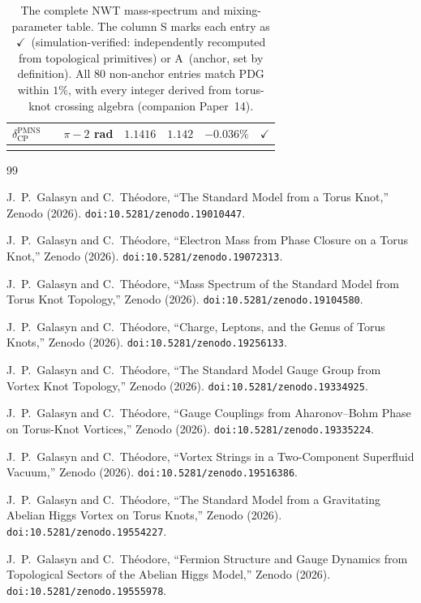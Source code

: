 \documentclass[11pt]{article}
\begin{document}
{\begin{longtable}{@{}p{1.2cm}p{2.4cm}p{4.8cm}p{1.6cm}p{1.4cm}rc@{}}
$\delta_\text{CP}^\text{PMNS}$ &  & $\pi{-}2$ rad & $1.1416$ & $1.142$ & $-0.036\%$ & $\checkmark$ \\
\bottomrule
\caption{The complete NWT mass-spectrum and mixing-parameter
table.  The column S marks each entry as
$\checkmark$~(simulation-verified: independently recomputed from
topological primitives) or
A~(anchor, set by definition).
All 80 non-anchor entries match PDG within $1\%$, with every
integer derived from torus-knot crossing algebra
(companion Paper~14).}
\label{tab:full-spectrum}
\end{longtable}
}

\begin{thebibliography}{99}

J.~P.~Galasyn and C.~Th\'eodore,
``The Standard Model from a Torus Knot,''
Zenodo (2026). \texttt{doi:10.5281/zenodo.19010447}.

J.~P.~Galasyn and C.~Th\'eodore,
``Electron Mass from Phase Closure on a Torus Knot,''
Zenodo (2026). \texttt{doi:10.5281/zenodo.19072313}.

J.~P.~Galasyn and C.~Th\'eodore,
``Mass Spectrum of the Standard Model from Torus Knot Topology,''
Zenodo (2026). \texttt{doi:10.5281/zenodo.19104580}.

J.~P.~Galasyn and C.~Th\'eodore,
``Charge, Leptons, and the Genus of Torus Knots,''
Zenodo (2026). \texttt{doi:10.5281/zenodo.19256133}.

J.~P.~Galasyn and C.~Th\'eodore,
``The Standard Model Gauge Group from Vortex Knot Topology,''
Zenodo (2026). \texttt{doi:10.5281/zenodo.19334925}.

J.~P.~Galasyn and C.~Th\'eodore,
``Gauge Couplings from Aharonov--Bohm Phase on Torus-Knot Vortices,''
Zenodo (2026). \texttt{doi:10.5281/zenodo.19335224}.

J.~P.~Galasyn and C.~Th\'eodore,
``Vortex Strings in a Two-Component Superfluid Vacuum,''
Zenodo (2026). \texttt{doi:10.5281/zenodo.19516386}.

J.~P.~Galasyn and C.~Th\'eodore,
``The Standard Model from a Gravitating Abelian Higgs Vortex
on Torus Knots,''
Zenodo (2026). \texttt{doi:10.5281/zenodo.19554227}.

J.~P.~Galasyn and C.~Th\'eodore,
``Fermion Structure and Gauge Dynamics from Topological Sectors
of the Abelian Higgs Model,''
Zenodo (2026). \texttt{doi:10.5281/zenodo.19555978}.


\end{thebibliography}
\end{document}

